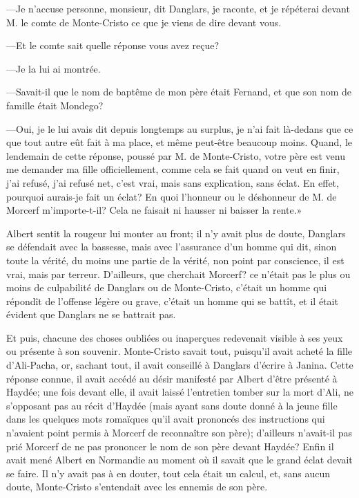—Je n'accuse personne, monsieur, dit Danglars, je raconte, et je répéterai devant M. le comte de Monte-Cristo ce que je viens de dire devant vous. 

—Et le comte sait quelle réponse vous avez reçue? 

—Je la lui ai montrée. 

—Savait-il que le nom de baptême de mon père était Fernand, et que son nom de famille était Mondego? 

—Oui, je le lui avais dit depuis longtemps au surplus, je n'ai fait là-dedans que ce que tout autre eût fait à ma place, et même peut-être beaucoup moins. Quand, le lendemain de cette réponse, poussé par M. de Monte-Cristo, votre père est venu me demander ma fille officiellement, comme cela se fait quand on veut en finir, j'ai refusé, j'ai refusé net, c'est vrai, mais sans explication, sans éclat. En effet, pourquoi aurais-je fait un éclat? En quoi l'honneur ou le déshonneur de M. de Morcerf m'importe-t-il? Cela ne faisait ni hausser ni baisser la rente.» 

Albert sentit la rougeur lui monter au front; il n'y avait plus de doute, Danglars se défendait avec la bassesse, mais avec l'assurance d'un homme qui dit, sinon toute la vérité, du moins une partie de la vérité, non point par conscience, il est vrai, mais par terreur. D'ailleurs, que cherchait Morcerf? ce n'était pas le plus ou moins de culpabilité de Danglars ou de Monte-Cristo, c'était un homme qui répondît de l'offense légère ou grave, c'était un homme qui se battît, et il était évident que Danglars ne se battrait pas. 

Et puis, chacune des choses oubliées ou inaperçues redevenait visible à ses yeux ou présente à son souvenir. Monte-Cristo savait tout, puisqu'il avait acheté la fille d'Ali-Pacha, or, sachant tout, il avait conseillé à Danglars d'écrire à Janina. Cette réponse connue, il avait accédé au désir manifesté par Albert d'être présenté à Haydée; une fois devant elle, il avait laissé l'entretien tomber sur la mort d'Ali, ne s'opposant pas au récit d'Haydée (mais ayant sans doute donné à la jeune fille dans les quelques mots romaïques qu'il avait prononcés des instructions qui n'avaient point permis à Morcerf de reconnaître son père); d'ailleurs n'avait-il pas prié Morcerf de ne pas prononcer le nom de son père devant Haydée? Enfin il avait mené Albert en Normandie au moment où il savait que le grand éclat devait se faire. Il n'y avait pas à en douter, tout cela était un calcul, et, sans aucun doute, Monte-Cristo s'entendait avec les ennemis de son père. 

